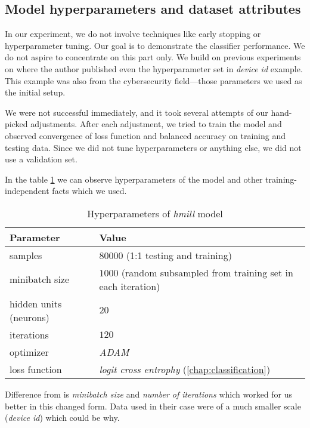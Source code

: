 \subsection{Model hyperparameters and dataset attributes}
In our experiment, we do not involve techniques like early stopping or hyperparameter tuning. Our goal is to demonstrate the classifier performance. We do not aspire to concentrate on this part only. We build on previous experiments on \cite{Mandlik2020} where the author published even the hyperparameter set in \emph{device id} example. This example was also from the cybersecurity field—those parameters we used as the initial setup.

We were not successful immediately, and it took several attempts of our hand-picked adjustments. After each adjustment, we tried to train the model and observed convergence of loss function and balanced accuracy on training and testing data. Since we did not tune hyperparameters or anything else, we did not use a validation set. 

In the table \ref{tab:hyperparams} we can observe hyperparameters of the model and other training-independent facts which we used.


\begin{table}[h]
  \centering
  \caption{Hyperparameters of \emph{hmill} model}
  \begin{tabular}{p{6cm}p{8cm}} 
      \toprule
      \textbf{Parameter} &
      \textbf{Value} \\
      \midrule
      samples & $80000$ (1:1 testing and training) \\
      \midrule
      minibatch size & $1000$ (random subsampled from training set in each iteration)\\
      \midrule
      hidden units (neurons)& $20$\\
      \midrule
      iterations & $120$\\
      \midrule
      optimizer & \emph{ADAM} \cite{Kingma2014}\\
      \midrule
      loss function & \emph{logit cross entrophy} (\ref{chap:classification})\\
      \bottomrule
  \end{tabular}
  \label{tab:hyperparams}
\end{table}


Difference from \cite{Mandlik2020} is \emph{minibatch size} and \emph{number of iterations} which worked for us better in this changed form. Data used in their case were of a much smaller scale (\emph{device id}) which could be why.

